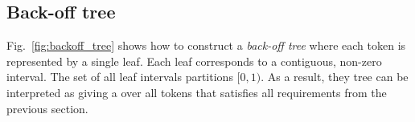 \documentclass{IIBproject}
\makeatletter
\DeclareRobustCommand*{\AbbreviationWithDot}[1]{\@ifnextchar{.}{#1}{#1.\@\xspace}}
\DeclareRobustCommand*{\pmf}{\AbbreviationWithDot{p.m.f}}
\makeatother
\begin{document}
\subsection{Back-off tree}

Fig.~\ref{fig:backoff_tree} shows how to construct a \emph{back-off tree} where each token is represented by a single leaf. Each leaf corresponds to a contiguous, non-zero interval. The set of all leaf intervals partitions $[0,1)$. As a result, they tree can be interpreted as giving a \pmf over all tokens that satisfies all requirements from the previous section.

\newlength{\vertexSize}
\setlength{\vertexSize}{10 pt}


%
\newcommand{\rootVertex}[2] {
	\node [vertex,fill=black!0] at (#1,#2) {};
}

%
\newcommand{\backoff}[6] {
	\draw [shorten >= 0.5*(\vertexSize+\pgflinewidth), shorten <= 0.5*(\vertexSize+\pgflinewidth), ->] (#1,#2) to [bend #5=12.5] (#3,#4);
	\node [vertex,fill=black!10] at (#3,#4) {\tiny #6};
}

%
\newcommand{\leaf}[6] {
	\draw [shorten >= 0.5*(\vertexSize+\pgflinewidth), shorten <= 0.5*(\vertexSize+\pgflinewidth), ->] (#1,#2) to [bend #5=12.5] (#3,#4);
	\node [vertex,fill=black!0] at (#3,#4) {\tiny #6};
}
\end{document}
